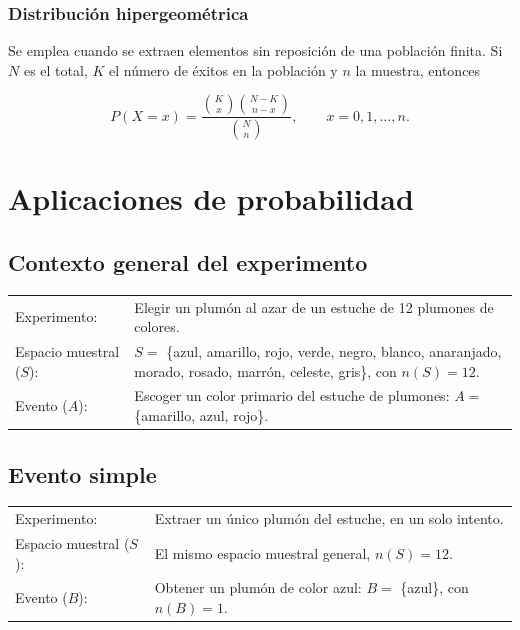 \documentclass[10pt,letterpaper]{article}
\begin{document}
\subsubsection{Distribución hipergeométrica}

Se emplea cuando se extraen elementos sin reposición de una población finita. Si $N$ es el total, $K$ el número de éxitos en la población y $n$ la muestra, entonces

\[P(X=x)=\frac{\binom{K}{x}\binom{N-K}{n-x}}{\binom{N}{n}},\qquad x=0,1,\dots,n.\]


\clearpage

\section{Aplicaciones de probabilidad}\label{sec:aplicaciones}

\subsection{Contexto general del experimento}

\noindent
\begin{tabularx}{\textwidth}{@{}l X@{}}
Experimento: & Elegir un plumón al azar de un estuche de 12 plumones de colores. \\[6pt]
Espacio muestral ($S$): & $S = $ \{azul, amarillo, rojo, verde, negro, blanco, anaranjado, morado, rosado, marrón, celeste, gris\}, con $n(S) = 12$. \\[6pt]
Evento ($A$): & Escoger un color primario del estuche de plumones: $A = $ \{amarillo, azul, rojo\}. \\[6pt]
\end{tabularx}

\subsection{Evento simple}

\noindent
\begin{tabularx}{\textwidth}{@{}l X@{}}
Experimento: & Extraer un único plumón del estuche, en un solo intento. \\[6pt]
Espacio muestral ($S$): & El mismo espacio muestral general, $n(S) = 12$. \\[6pt]
Evento ($B$): & Obtener un plumón de color azul: $B = $ \{azul\}, con $n(B) = 1$. \\[6pt]
\end{tabularx}
\end{document}
